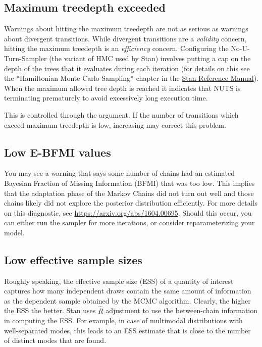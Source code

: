 \subsection{Maximum treedepth exceeded}

Warnings about hitting the maximum treedepth are not as serious as warnings 
about divergent transitions. While divergent transitions are a {\it validity}
concern, hitting the maximum treedepth is an {\it efficiency} concern. Configuring
the No-U-Turn-Sampler (the variant of HMC used by Stan) involves putting a cap
on the depth of the trees that it evaluates during each iteration (for details
on this see the *Hamiltonian Monte Carlo Sampling* chapter in the 
\href{https://mc-stan.org/docs/reference-manual/hmc-chapter.html}{Stan Reference Manual}).
When the maximum allowed tree depth is 
reached it indicates that NUTS is terminating prematurely to avoid excessively 
long execution time.

This is controlled through the  argument.
If the number of transitions which exceed maximum treedepth is low, increasing
 may correct this problem.


\subsection{Low E-BFMI values}

You may see a warning that says some number of chains had an estimated Bayesian
Fraction of Missing Information (BFMI) that was too low. This implies that the
adaptation phase of the Markov Chains did not turn out well and those chains
likely did not explore the posterior distribution efficiently. For more details
on this diagnostic, see \url{https://arxiv.org/abs/1604.00695}.
Should this occur, you can either run the sampler for more iterations, or consider
reparameterizing your model.

\subsection{Low effective sample sizes}


Roughly speaking, the effective sample size (ESS) of a quantity of
interest captures how many independent draws contain the same amount
of information as the dependent sample obtained by the MCMC
algorithm. Clearly, the higher the ESS the better.  Stan uses $\hat{R}$
adjustment to use the between-chain information in computing the
ESS. For example, in case of multimodal distributions with
well-separated modes, this leads to an ESS estimate that is close to
the number of distinct modes that are found.

